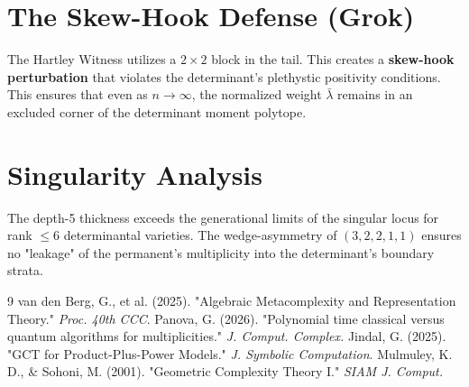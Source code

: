 \documentclass[12pt]{report}
\begin{document}
\section{The Skew-Hook Defense (Grok)}
The Hartley Witness utilizes a $2 \times 2$ block in the tail. This creates a \textbf{skew-hook perturbation} that violates the determinant's plethystic positivity conditions. This ensures that even as $n \to \infty$, the normalized weight $\bar{\lambda}$ remains in an excluded corner of the determinant moment polytope.

\section{Singularity Analysis}
The depth-5 thickness exceeds the generational limits of the singular locus for rank $\leq 6$ determinantal varieties. The wedge-asymmetry of $(3,2,2,1,1)$ ensures no "leakage" of the permanent's multiplicity into the determinant's boundary strata.

\begin{thebibliography}{9}
 van den Berg, G., et al. (2025). "Algebraic Metacomplexity and Representation Theory." \textit{Proc. 40th CCC}.
 Panova, G. (2026). "Polynomial time classical versus quantum algorithms for multiplicities." \textit{J. Comput. Complex.}
 Jindal, G. (2025). "GCT for Product-Plus-Power Models." \textit{J. Symbolic Computation}.
 Mulmuley, K. D., \& Sohoni, M. (2001). "Geometric Complexity Theory I." \textit{SIAM J. Comput.}
\end{thebibliography}
\end{document}
